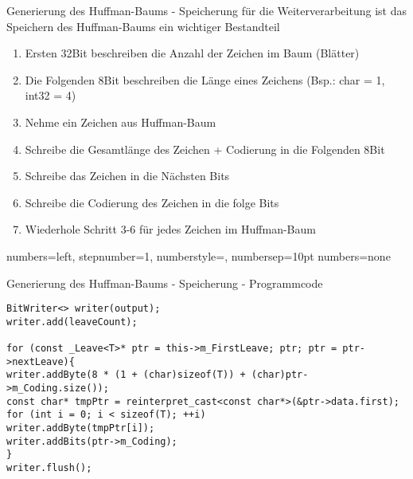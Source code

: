 \documentclass{beamer}
\begin{document}
  \begin{frame}{Generierung des Huffman-Baums - \newline Speicherung} \label{HeaderFile}
	für die Weiterverarbeitung ist das Speichern des Huffman-Baums ein wichtiger Bestandteil
  	\begin{enumerate}
  		\item Ersten 32Bit beschreiben die Anzahl der Zeichen im Baum (Blätter)
  		\item Die Folgenden 8Bit beschreiben die Länge eines Zeichens \newline (Bsp.: char = 1, int32 = 4)
  		\item Nehme ein Zeichen aus Huffman-Baum
  		\item Schreibe die Gesamtlänge des Zeichen + Codierung in die Folgenden 8Bit
  		\item Schreibe das Zeichen in die Nächsten Bits
  		\item Schreibe die Codierung des Zeichen in die folge Bits
  		\item Wiederhole Schritt 3-6 für jedes Zeichen im Huffman-Baum
  	\end{enumerate}
  \end{frame}
  
  {numbers=left, stepnumber=1, numberstyle=\tiny, numbersep=10pt}
  {numbers=none}
  
  \begin{frame}[fragile]{Generierung des Huffman-Baums - \newline Speicherung - Programmcode}
  	\begin{lstlisting}[style=numbers]
BitWriter<> writer(output);
writer.add(leaveCount);

for (const _Leave<T>* ptr = this->m_FirstLeave; ptr; ptr = ptr->nextLeave){
writer.addByte(8 * (1 + (char)sizeof(T)) + (char)ptr->m_Coding.size());
const char* tmpPtr = reinterpret_cast<const char*>(&ptr->data.first);
for (int i = 0; i < sizeof(T); ++i)
writer.addByte(tmpPtr[i]);
writer.addBits(ptr->m_Coding);
}
writer.flush();
    \end{lstlisting}
\end{frame}
    
\end{document}
